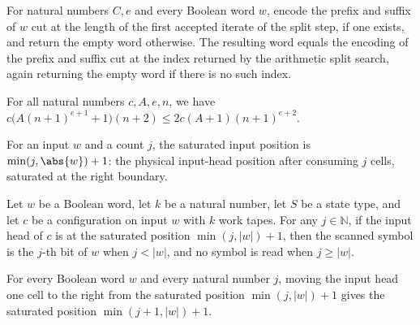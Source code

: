 \begin{lemma}
\label{Turing.FinTM.splitLoop_result}
\leanok
{}
For natural numbers $C,e$ and every Boolean word $w$, encode the prefix and suffix of
$w$ cut at the length of the first accepted iterate of the split step, if one exists,
and return the empty word otherwise. The resulting word equals the encoding of the
prefix and suffix cut at the index returned by the arithmetic split search, again
returning the empty word if there is no such index.
\end{lemma}

\begin{lemma}
\label{Turing.FinTM.splitLoop_bound}
\leanok
{}
For all natural numbers $c,A,e,n$, we have $c\bigl(A(n+1)^{e+1}+1\bigr)(n+2)\le
2c(A+1)(n+1)^{e+2}$.
\end{lemma}

\begin{definition}
\label{Turing.FinTM.splitPos}
\leanok
For an input $w$ and a count $j$, the saturated input position is
$\min(j, \abs{w}) + 1$: the physical input-head position after consuming
$j$ cells, saturated at the right boundary.
\end{definition}

\begin{lemma}
\label{Turing.FinTM.splitPos_read}
\leanok
{}
Let $w$ be a Boolean word, let $k$ be a natural number, let $S$ be a state type, and let
$c$ be a configuration on input $w$ with $k$ work tapes. For any $j\in\mathbb N$, if the
input head of $c$ is at the saturated position $\min(j,|w|)+1$, then the scanned symbol
is the $j$-th bit of $w$ when $j<|w|$, and no symbol is read when $j\ge |w|$.
\end{lemma}

\begin{lemma}
\label{Turing.FinTM.splitPos_succ}
\leanok
{}
For every Boolean word $w$ and every natural number $j$, moving the input head one cell
to the right from the saturated position $\min(j,|w|)+1$ gives the saturated position
$\min(j+1,|w|)+1$.
\end{lemma}

